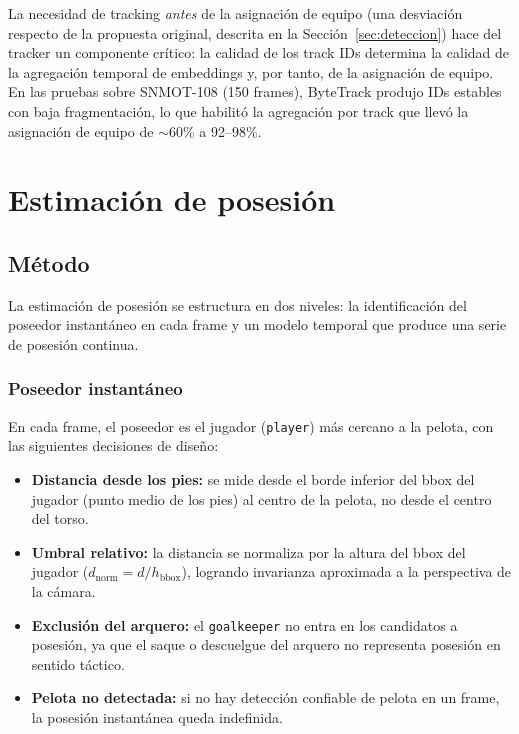 \documentclass[conference]{IEEEtran}
\begin{document}
La necesidad de tracking \emph{antes} de la asignación de equipo (una
desviación respecto de la propuesta original, descrita en la
Sección~\ref{sec:deteccion}) hace del tracker un componente crítico: la
calidad de los track IDs determina la calidad de la agregación temporal
de embeddings y, por tanto, de la asignación de equipo. En las pruebas
sobre SNMOT-108 (150 frames), ByteTrack produjo IDs estables con baja
fragmentación, lo que habilitó la agregación por track que llevó la
asignación de equipo de $\sim$60\% a 92--98\%.

\section{Estimación de posesión}
\label{sec:posesion}

\subsection{Método}

La estimación de posesión se estructura en dos niveles: la identificación
del poseedor instantáneo en cada frame y un modelo temporal que produce
una serie de posesión continua.

\subsubsection{Poseedor instantáneo}

En cada frame, el poseedor es el jugador (\texttt{player}) más cercano a
la pelota, con las siguientes decisiones de diseño:

\begin{itemize}
    \item \textbf{Distancia desde los pies:} se mide desde el borde
    inferior del bbox del jugador (punto medio de los pies) al centro de la
    pelota, no desde el centro del torso.
    \item \textbf{Umbral relativo:} la distancia se normaliza por la altura
    del bbox del jugador ($d_\text{norm} = d / h_\text{bbox}$), logrando
    invarianza aproximada a la perspectiva de la cámara.
    \item \textbf{Exclusión del arquero:} el \texttt{goalkeeper} no entra
    en los candidatos a posesión, ya que el saque o descuelgue del arquero
    no representa posesión en sentido táctico.
    \item \textbf{Pelota no detectada:} si no hay detección confiable de
    pelota en un frame, la posesión instantánea queda indefinida.
\end{itemize}
\end{document}
